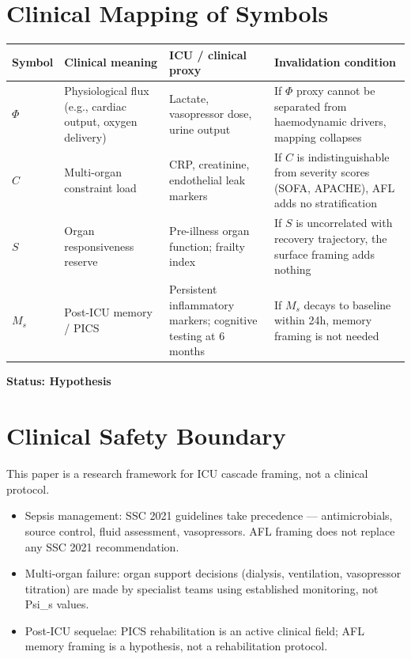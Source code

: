 \documentclass[11pt]{article}
\begin{document}
\section{Clinical Mapping of Symbols}

\begin{center}
\begin{tabular}{p{1.5cm}p{2.8cm}p{3.5cm}p{5cm}}
\toprule
Symbol & Clinical meaning & ICU / clinical proxy & Invalidation condition \\
\midrule
$\Phi$ & Physiological flux (e.g., cardiac output, oxygen delivery) & Lactate, vasopressor dose, urine output & If $\Phi$ proxy cannot be separated from haemodynamic drivers, mapping collapses \\
$C$ & Multi-organ constraint load & CRP, creatinine, endothelial leak markers & If $C$ is indistinguishable from severity scores (SOFA, APACHE), AFL adds no stratification \\
$S$ & Organ responsiveness reserve & Pre-illness organ function; frailty index & If $S$ is uncorrelated with recovery trajectory, the surface framing adds nothing \\
$M_s$ & Post-ICU memory / PICS & Persistent inflammatory markers; cognitive testing at 6 months & If $M_s$ decays to baseline within 24h, memory framing is not needed \\
\bottomrule
\end{tabular}
\end{center}

\textbf{Status: Hypothesis}

\section{Clinical Safety Boundary}

This paper is a research framework for ICU cascade framing, not a clinical protocol.
\begin{itemize}
    \item Sepsis management: SSC 2021 guidelines take precedence — antimicrobials, source control, fluid assessment, vasopressors. AFL framing does not replace any SSC 2021 recommendation.
    \item Multi-organ failure: organ support decisions (dialysis, ventilation, vasopressor titration) are made by specialist teams using established monitoring, not Psi\_s values.
    \item Post-ICU sequelae: PICS rehabilitation is an active clinical field; AFL memory framing is a hypothesis, not a rehabilitation protocol.
\end{itemize}
\end{document}
